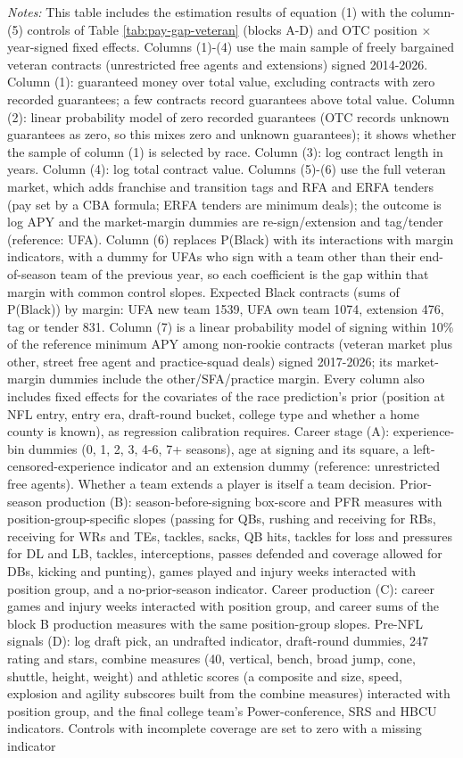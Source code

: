 {\footnotesize
\noindent\textit{Notes:} This table includes the estimation results of equation (1) with the column-(5) controls of Table \ref{tab:pay-gap-veteran} (blocks A-D) and OTC position $\times$ year-signed fixed effects. Columns (1)-(4) use the main sample of freely bargained veteran contracts (unrestricted free agents and extensions) signed 2014-2026. Column (1): guaranteed money over total value, excluding contracts with zero recorded guarantees; a few contracts record guarantees above total value. Column (2): linear probability model of zero recorded guarantees (OTC records unknown guarantees as zero, so this mixes zero and unknown guarantees); it shows whether the sample of column (1) is selected by race. Column (3): log contract length in years. Column (4): log total contract value. Columns (5)-(6) use the full veteran market, which adds franchise and transition tags and RFA and ERFA tenders (pay set by a CBA formula; ERFA tenders are minimum deals); the outcome is log APY and the market-margin dummies are re-sign/extension and tag/tender (reference: UFA). Column (6) replaces P(Black) with its interactions with margin indicators, with a dummy for UFAs who sign with a team other than their end-of-season team of the previous year, so each coefficient is the gap within that margin with common control slopes. Expected Black contracts (sums of P(Black)) by margin: UFA new team 1539, UFA own team 1074, extension 476, tag or tender 831. Column (7) is a linear probability model of signing within 10\% of the reference minimum APY among non-rookie contracts (veteran market plus other, street free agent and practice-squad deals) signed 2017-2026; its market-margin dummies include the other/SFA/practice margin. Every column also includes fixed effects for the covariates of the race prediction's prior (position at NFL entry, entry era, draft-round bucket, college type and whether a home county is known), as regression calibration requires. Career stage (A): experience-bin dummies (0, 1, 2, 3, 4-6, 7+ seasons), age at signing and its square, a left-censored-experience indicator and an extension dummy (reference: unrestricted free agents). Whether a team extends a player is itself a team decision. Prior-season production (B): season-before-signing box-score and PFR measures with position-group-specific slopes (passing for QBs, rushing and receiving for RBs, receiving for WRs and TEs, tackles, sacks, QB hits, tackles for loss and pressures for DL and LB, tackles, interceptions, passes defended and coverage allowed for DBs, kicking and punting), games played and injury weeks interacted with position group, and a no-prior-season indicator. Career production (C): career games and injury weeks interacted with position group, and career sums of the block B production measures with the same position-group slopes. Pre-NFL signals (D): log draft pick, an undrafted indicator, draft-round dummies, 247 rating and stars, combine measures (40, vertical, bench, broad jump, cone, shuttle, height, weight) and athletic scores (a composite and size, speed, explosion and agility subscores built from the combine measures) interacted with position group, and the final college team's Power-conference, SRS and HBCU indicators. Controls with incomplete coverage are set to zero with a missing indicator }
